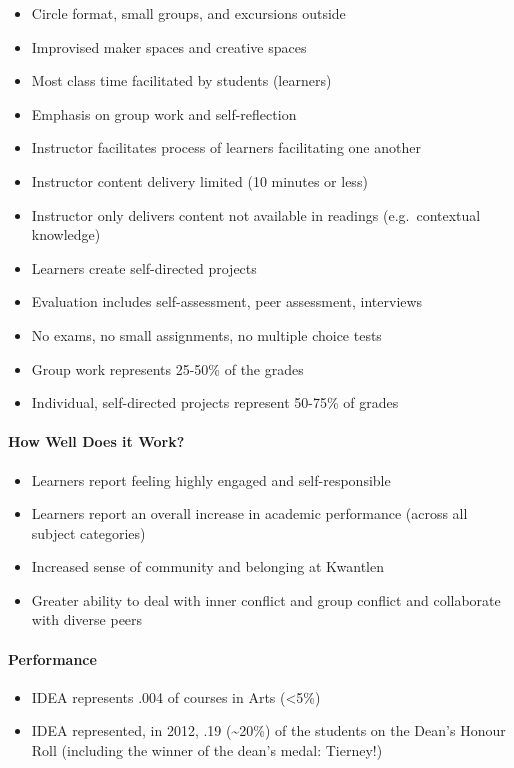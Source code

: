 \documentclass[letterpaper,10pt,headsepline]{scrreprt}
\begin{document}
\begin{itemize}
\itemsep1pt\parskip0pt
\item
  Circle format, small groups, and excursions outside
\item
  Improvised maker spaces and creative spaces
\item
  Most class time facilitated by students (learners)
\item
  Emphasis on group work and self-reflection
\item
  Instructor facilitates process of learners facilitating one another
\item
  Instructor content delivery limited (10 minutes or less)
\item
  Instructor only delivers content not available in readings
  (e.g.~contextual knowledge)
\item
  Learners create self-directed projects
\item
  Evaluation includes self-assessment, peer assessment, interviews
\item
  No exams, no small assignments, no multiple choice tests
\item
  Group work represents 25-50\% of the grades
\item
  Individual, self-directed projects represent 50-75\% of grades
\end{itemize}

\paragraph{How Well Does it Work?}

\begin{itemize}
\itemsep1pt\parskip0pt
\item
  Learners report feeling highly engaged and self-responsible
\item
  Learners report an overall increase in academic performance (across
  all subject categories)
\item
  Increased sense of community and belonging at Kwantlen
\item
  Greater ability to deal with inner conflict and group conflict and
  collaborate with diverse peers
\end{itemize}

\paragraph{Performance}

\begin{itemize}
\itemsep1pt\parskip0pt
\item
  IDEA represents .004 of courses in Arts (\textless{}5\%)
\item
  IDEA represented, in 2012, .19 (\textasciitilde{}20\%) of the students
  on the Dean's Honour Roll (including the winner of the dean's medal:
  Tierney!)
\end{itemize}
\end{document}
